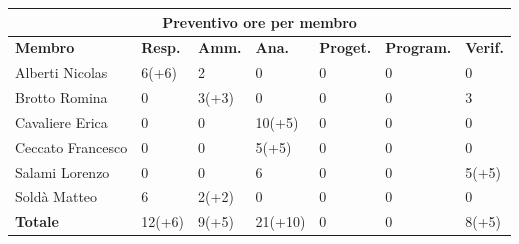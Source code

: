 \documentclass[a4paper, 12pt]{article}
\begin{document}
\begin{center}
	\begin{tabularx}{\textwidth}{|X|X|X|X|X|X|X|}
		\hline
		\multicolumn{7}{|c|}{\textbf{Preventivo ore per membro}}                                \\
		\hline
		\hline
		\textbf{Membro}   & \textbf{Resp.}    & \textbf{Amm.}   & \textbf{Ana.} &
		\textbf{Proget.}  & \textbf{Program.} & \textbf{Verif.}                                 \\
		\hline
		Alberti Nicolas   & 6(+6)             & 2               & 0             & 0 & 0 & 0     \\
		\hline
		Brotto Romina     & 0                 & 3(+3)           & 0             & 0 & 0 & 3     \\
		\hline
		Cavaliere Erica   & 0                 & 0               & 10(+5)        & 0 & 0 & 0     \\
		\hline
		Ceccato Francesco & 0                 & 0               & 5(+5)         & 0 & 0 & 0     \\
		\hline
		Salami Lorenzo    & 0                 & 0               & 6             & 0 & 0 & 5(+5) \\
		\hline
		Soldà Matteo      & 6                 & 2(+2)           & 0             & 0 & 0 & 0     \\
		\hline
		\hline
		\textbf{Totale}   & 12(+6)            & 9(+5)           & 21(+10)       & 0 & 0 & 8(+5) \\
		\hline
	\end{tabularx}\\[8pt]
	\mbox{}\\
\end{center}

\newpage
\end{document}

